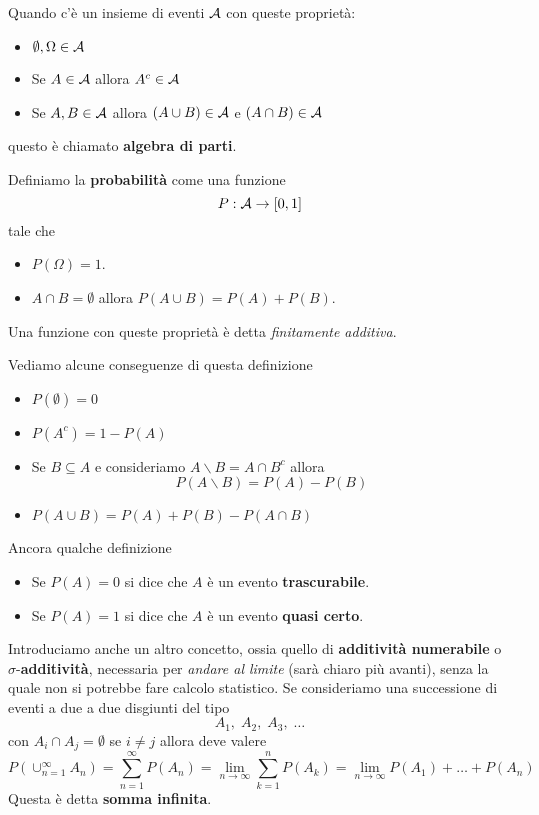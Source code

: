 \begin{definition}
	Quando c'è un insieme di eventi $\mathcal{A}$ con queste proprietà:
	\begin{itemize}
		\item $\emptyset, \Omega \in \mathcal{A}$
		\item Se $A \in \mathcal{A}$ allora $A^c \in \mathcal{A}$
		\item Se $A, B \in \mathcal{A}$ allora $(A \cup B) \in \mathcal{A}$ e $(A \cap B) \in \mathcal{A}$
	\end{itemize}
	questo è chiamato \textbf{algebra di parti}.
\end{definition}

\begin{definition}[Provvisoria]
	Definiamo la \textbf{probabilità} come una funzione
	\[ P : \mathcal{A} \to [0, 1] \]
	tale che
	\begin{itemize}
		\item $P (\Omega) = 1$.
		\item $A \cap B = \emptyset$ allora $P(A \cup B) = P(A) + P(B)$.
	\end{itemize}
	Una funzione con queste proprietà è detta \emph{finitamente additiva}.
\end{definition}

Vediamo alcune conseguenze di questa definizione
\begin{itemize}
	\item $P(\emptyset) = 0$
	\item $P(A^c) = 1 - P(A)$
	\item Se $B \subseteq A$ e consideriamo $A \backslash B = A \cap B^c$ allora
	      \[ P(A \backslash B) = P(A) - P(B) \]
	\item $P(A \cup B) = P(A) + P(B) - P(A \cap B)$
\end{itemize}
Ancora qualche definizione
\begin{itemize}
	\item Se $P(A) = 0$ si dice che $A$ è un evento \textbf{trascurabile}.
	\item Se $P(A) = 1$ si dice che $A$ è un evento \textbf{quasi certo}.
\end{itemize}
Introduciamo anche un altro concetto, ossia quello di \textbf{additività numerabile} o
$\sigma$-\textbf{additività}, necessaria per \emph{andare al limite} (sarà chiaro più avanti), senza la
quale non si potrebbe fare calcolo statistico. Se consideriamo una successione di eventi a due a due
disgiunti del tipo
\[ A_1, \; A_2, \; A_3, \; \dots \]
con $A_i \cap A_j = \emptyset$ se $i \neq j$ allora deve valere
\[
	P(\cup_{n=1}^\infty A_n) = \sum_{n=1}^\infty P(A_n) =
	\lim_{n \to \infty} \sum_{k=1}^n P(A_k) = 	\lim_{n \to \infty} P(A_1) + \dots + P(A_n)
\]
Questa è detta \textbf{somma infinita}.

